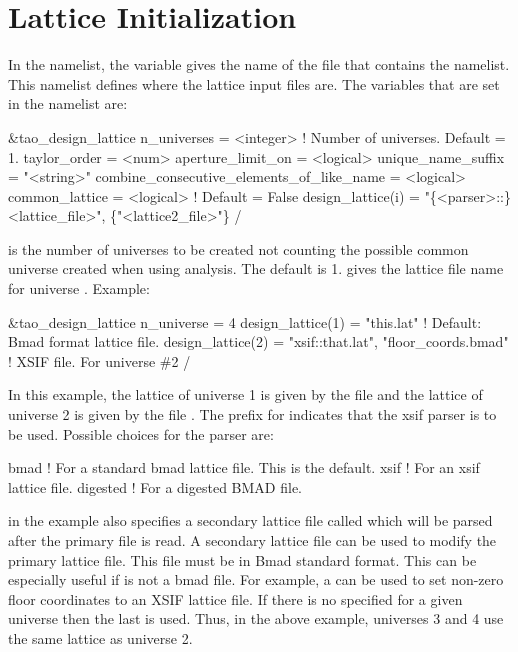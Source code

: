 \section{Lattice Initialization}
\label{s:init.lat} 

In the  namelist, the  variable gives
the name of the file that contains the 
namelist. This namelist defines where the lattice input files are. The
variables that are set in the  namelist are:
\begin{example}
  &tao_design_lattice
    n_universes        = <integer>      ! Number of universes. Default = 1.
    taylor_order       = <num>
    aperture_limit_on  = <logical>
    unique_name_suffix = "<string>"
    combine_consecutive_elements_of_like_name = <logical>
    common_lattice = <logical>        ! Default = False
    design_lattice(i) = "\{<parser>::\}<lattice_file>", \{"<lattice2_file>"\}
  /
\end{example}

 is the number of universes to be created not counting
the possible common universe created when using  analysis. The
default is 1.   gives the lattice file name for
universe .  Example:
\begin{example}
  &tao_design_lattice
    n_universe = 4
    design_lattice(1) = "this.lat"      ! Default: Bmad format lattice file.
    design_lattice(2) = "xsif::that.lat", "floor_coords.bmad"
                                        ! XSIF file. For universe \#2 
  /
\end{example}
In this example, the lattice of universe 1 is given by the file
 and the lattice of universe 2 is given by the file
. The  prefix for 
indicates that the xsif parser is to be used. Possible
choices for the parser are:
\begin{example}
  bmad      ! For a standard bmad lattice file. This is the default.
  xsif      ! For an xsif lattice file.
  digested  ! For a digested BMAD file.
\end{example}
 in the example also specifies a secondary
lattice file called  which will be parsed after
the primary  file is read. A secondary lattice file can
be used to modify the primary lattice file. This file must be in Bmad
standard format. This can be especially useful if  is
not a bmad file. For example, a  can be used to set
non-zero floor coordinates to an XSIF lattice file. If there is no
 specified for a given universe then the last
 is used. Thus, in the above example, universes 3
and 4 use the same lattice as universe 2.

